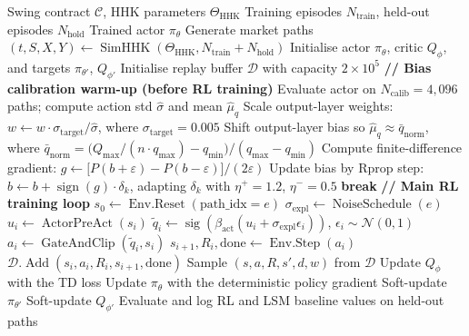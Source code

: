 \documentclass[a4paper,fleqn]{cas-dc}
\begin{document}
\begin{algorithm}[htbp]
\caption{Actor--critic training for swing-option pricing}
\label{alg:training}
\begin{algorithmic}[1]
\Require Swing contract $\mathcal{C}$, HHK parameters $\Theta_{\mathrm{HHK}}$
\Require Training episodes $N_{\mathrm{train}}$, held-out episodes $N_{\mathrm{hold}}$
\Ensure Trained actor $\pi_\theta$
\State Generate market paths $(t,S,X,Y) \gets \operatorname{SimHHK}(\Theta_{\mathrm{HHK}},N_{\mathrm{train}}+N_{\mathrm{hold}})$
\State Initialise actor $\pi_\theta$, critic $Q_\phi$, and targets $\pi_{\theta'}$, $Q_{\phi'}$
\State Initialise replay buffer $\mathcal{D}$ with capacity $2 \times 10^5$
\Statex \textbf{// Bias calibration warm-up (before RL training)}
\State Evaluate actor on $N_{\mathrm{calib}} = 4{,}096$ paths; compute action std $\hat\sigma$ and mean $\hat\mu_q$
\State Scale output-layer weights: $w \gets w \cdot \sigma_{\mathrm{target}} / \hat\sigma$, where $\sigma_{\mathrm{target}} = 0.005$
\State Shift output-layer bias so $\hat\mu_q \approx \bar{q}_{\mathrm{norm}}$, where $\bar{q}_{\mathrm{norm}} = \bigl(Q_{\max}/(n \cdot q_{\max}) - q_{\min}\bigr)/(q_{\max}-q_{\min})$
    \State Compute finite-difference gradient: $g \gets \bigl[P(b+\varepsilon) - P(b-\varepsilon)\bigr]/(2\varepsilon)$
    \State Update bias by Rprop step: $b \gets b + \operatorname{sign}(g)\cdot\delta_k$, adapting $\delta_k$ with $\eta^+=1.2$, $\eta^-=0.5$
     \textbf{break} \EndIf
\EndFor
\Statex \textbf{// Main RL training loop}
    \State $s_0 \gets \operatorname{Env.Reset}(\text{path\_idx}=e)$
        \State $\sigma_{\mathrm{expl}} \gets \operatorname{NoiseSchedule}(e)$
        \State $u_i \gets \operatorname{ActorPreAct}(s_i)$
        \State $\tilde{q}_i \gets \operatorname{sig}(\beta_{\mathrm{act}}(u_i + \sigma_{\mathrm{expl}} \epsilon_i))$, $\epsilon_i \sim \mathcal{N}(0,1)$
        \State $a_i \gets \operatorname{GateAndClip}(\tilde{q}_i,s_i)$
        \State $s_{i+1}, R_i, \mathrm{done} \gets \operatorname{Env.Step}(a_i)$
        \State $\mathcal{D}.\operatorname{Add}(s_i,a_i,R_i,s_{i+1},\mathrm{done})$
            \State Sample $(s,a,R,s',d,w)$ from $\mathcal{D}$
            \State Update $Q_\phi$ with the TD loss
                \State Update $\pi_\theta$ with the deterministic policy gradient
                \State Soft-update $\pi_{\theta'}$
            \EndIf
            \State Soft-update $Q_{\phi'}$
        \EndIf
    \EndFor
        \State Evaluate and log RL and LSM baseline values on held-out paths
    \EndIf
\EndFor
\end{algorithmic}
\end{algorithm}
\end{document}
